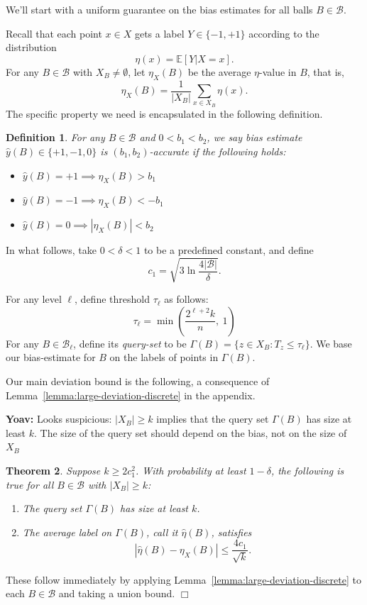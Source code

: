 \documentclass{article}
\def\E{{\mathbb E}}
\def\B{{\mathcal B}}
\def\yh{{\widehat{y}}}
\newtheorem{thm}{Theorem}
\newtheorem{defn}[thm]{Definition}
\newenvironment{proof}{\noindent {\sc Proof:}}{$\Box$ \medskip}
\newcommand{\yoav}[1]{{\color{blue} {\bf Yoav:} #1}}
\begin{document}
We'll start with a uniform guarantee on the bias estimates for all balls $B \in \B$.

Recall that each point $x \in X$ gets a label $Y \in \{-1,+1\}$ according to the distribution
$$ \eta(x) = \E[Y | X=x].$$ 
For any $B \in \B$ with $X_B \neq \emptyset$, let $\eta_X(B)$ be the average $\eta$-value in $B$, that is,
$$ \eta_X(B) = \frac{1}{|X_B|} \sum_{x \in X_B} \eta(x) .$$
The specific property we need is encapsulated in the following definition.
\begin{defn}
For any $B \in \B$ and $0 < b_1 < b_2$, we say bias estimate $\yh(B) \in \{+1,-1,0\}$ is \emph{$(b_1,b_2)$-accurate} if the following holds:
\begin{itemize}
\item $\yh(B) = +1 \implies \eta_X(B) > b_1$
\item $\yh(B) = -1 \implies \eta_X(B) < -b_1$
\item $\yh(B) = 0 \implies |\eta_X(B)| < b_2$
\end{itemize}
\label{def:accurate-bias-estimate}
\end{defn}

In what follows, take $0 < \delta < 1$ to be a predefined constant, and define
\begin{equation}
c_1 = \sqrt{3 \ln \frac{4|\B|}{\delta}} .
\label{eq:c1}
\end{equation}

For any level $\ell$, define threshold $\tau_\ell$ as follows:
\begin{equation}
\tau_\ell = \min \left( \frac{2^{\ell+2}k}{n}, \ 1 \right)
\label{eq:threshold-ell}
\end{equation}
For any $B \in \B_\ell$, define its \emph{query-set} to be $\Gamma(B) = \{z \in X_B: T_z \leq \tau_\ell\}$. We base our bias-estimate for $B$ on the labels of points in $\Gamma(B)$.

Our main deviation bound is the following, a consequence of Lemma~\ref{lemma:large-deviation-discrete} in the appendix.

\yoav{Looks suspicious: $|X_B| \geq k$ implies that the query set $\Gamma(B)$ has size at least $k$. The size of the query set should depend on the bias, not on the size of $X_B$}
\begin{thm}
Suppose $k \geq 2c_1^2$. With probability at least $1-\delta$, the following is true for all $B \in \B$ with $|X_B| \geq k$:
\begin{enumerate}
\item[(a)] The query set $\Gamma(B)$ has size at least $k$.
\item[(b)] The average label on $\Gamma(B)$, call it $\widehat{\eta}(B)$, satisfies
$$ \left| \widehat{\eta}(B) - \eta_X(B) \right| \leq \frac{4c_1}{\sqrt{k}}.$$
\end{enumerate}
\label{thm:large-deviation-bounds}
\end{thm}
\begin{proof}
These follow immediately by applying Lemma~\ref{lemma:large-deviation-discrete} to each $B \in \B$ and taking a union bound. 
\end{proof}
\end{document}
